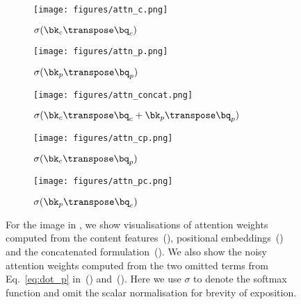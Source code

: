 \documentclass[10pt,twocolumn,letterpaper]{article}
\begin{document}
 \begin{figure*}[t]\captionsetup[subfigure]{font=footnotesize}
   \begin{subfigure}[t]{0.195\linewidth}
     \centering
     \texttt{[image: figures/attn\_c.png]}
     \caption{$\sigma(\bk_c\transpose \bq_c)$}
     \label{fig:attn-c}
   \end{subfigure}
   \hfill
   \begin{subfigure}[t]{0.195\linewidth}
     \centering
     \texttt{[image: figures/attn\_p.png]}
     \caption{$\sigma(\bk_p\transpose \bq_p)$}
     \label{fig:attn-p}
   \end{subfigure}
   \hfill
   \begin{subfigure}[t]{0.195\linewidth}
     \centering
     \texttt{[image: figures/attn\_concat.png]}
     \caption{$\sigma(\bk_c\transpose \bq_c + \bk_p\transpose \bq_p)$}
     \label{fig:attn-concat}
   \end{subfigure}
   \hfill
   \begin{subfigure}[t]{0.195\linewidth}
     \centering
     \texttt{[image: figures/attn\_cp.png]}
     \caption{$\sigma(\bk_c\transpose \bq_p)$}
     \label{fig:attn-cp}
   \end{subfigure}
   \hfill
   \begin{subfigure}[t]{0.195\linewidth}
     \centering
     \texttt{[image: figures/attn\_pc.png]}
     \caption{$\sigma(\bk_p\transpose \bq_c)$}
     \label{fig:attn-pc}
   \end{subfigure}
   \vspace{5px}
   \caption{For the image in , we show visualisations of attention weights computed from the content features~(), positional embeddings~() and the concatenated formulation~(). We also show the noisy attention weights computed from the two omitted terms from Eq.~\ref{eq:dot_p} in~() and~(). Here we use $\sigma$ to denote the softmax function and omit the scalar normalisation for brevity of exposition.}
   \label{fig:attn}
\end{figure*}
\end{document}
